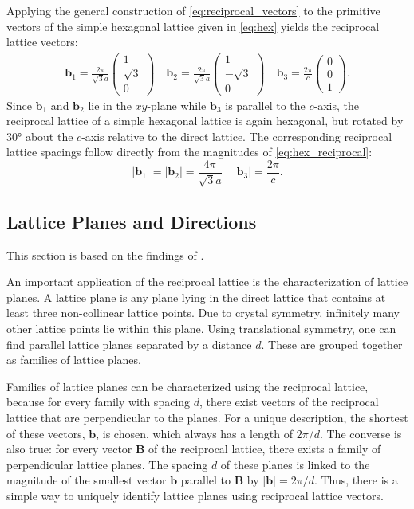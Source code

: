 Applying the general construction of \cref{eq:reciprocal_vectors} to the
primitive vectors of the simple hexagonal lattice given in \cref{eq:hex} yields
the reciprocal lattice vectors:
\begin{align}
	\mathbf{b}_{1}=\frac{2\pi}{\sqrt{ 3 }a}\begin{pmatrix}1 \\ \sqrt{ 3 } \\ 0\end{pmatrix} \quad \mathbf{b}_{2}=\frac{2\pi}{\sqrt{ 3 }a}\begin{pmatrix}1 \\ -\sqrt{ 3 } \\ 0\end{pmatrix} \quad \mathbf{b}_{3}= \frac{2\pi}{c}\begin{pmatrix}0 \\ 0 \\ 1\end{pmatrix}. \label{eq:hex_reciprocal}
\end{align}
Since $\mathbf{b}_{1}$ and $\mathbf{b}_{2}$ lie in the $xy$-plane while $\mathbf{b}
_{3}$ is parallel to the $c$-axis, the reciprocal lattice of a simple hexagonal
lattice is again hexagonal, but rotated by \ang{30} about the $c$-axis relative
to the direct lattice. The corresponding reciprocal lattice spacings follow directly
from the magnitudes of \cref{eq:hex_reciprocal}:
\begin{equation}
	\lvert \mathbf{b}_{1}\rvert =\lvert \mathbf{b}_{2}\rvert = \frac{4\pi}{\sqrt{3}a}
	\quad \lvert \mathbf{b}_{3}\rvert =\frac{2\pi}{c}.
\end{equation}

\subsection{Lattice Planes and Directions}
\label{sec:lattice_planes_and_directions} This section is based on the findings of
.

An important application of the reciprocal lattice is the characterization of
lattice planes. A lattice plane is any plane lying in the direct lattice that contains
at least three non-collinear lattice points. Due to crystal symmetry, infinitely many
other lattice points lie within this plane. Using translational symmetry, one can
find parallel lattice planes separated by a distance $d$. These are grouped
together as families of lattice planes.

Families of lattice planes can be characterized using the reciprocal lattice, because
for every family with spacing $d$, there exist vectors of the reciprocal lattice
that are perpendicular to the planes. For a unique description, the shortest of
these vectors, $\mathbf{b}$, is chosen, which always has a length of $2 \pi / d$.
The converse is also true: for every vector $\mathbf{B}$ of the reciprocal lattice,
there exists a family of perpendicular lattice planes. The spacing $d$ of these planes
is linked to the magnitude of the smallest vector $\mathbf{b}$ parallel to $\mathbf{B}$
by $\lvert \mathbf{b}\rvert=2\pi /d$. Thus, there is a simple way to uniquely identify
lattice planes using reciprocal lattice vectors.

